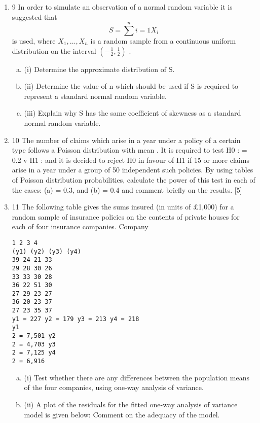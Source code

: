 \documentclass[a4paper,12pt]{article}
\begin{document}
\begin{enumerate}
\item
9 In order to simulate an observation of a normal random variable it is suggested that
\[S = \sum^{n}{i=1} X_i\]
is used, where $X_1, \ldots , X_n$ is a random sample from a continuous uniform distribution
on the interval $\displaystyle \left( -\frac{1}{2}, \frac{1}{2} \right)$ .
\begin{enumerate}[(a)]
    \item (i) Determine the approximate distribution of S. 
    \item (ii) Determine the value of n which should be used if S is required to represent a
standard normal random variable. 
    \item (iii) Explain why S has the same coefficient of skewness as a standard normal
random variable. 
\end{enumerate}

\item 10 The number of claims which arise in a year under a policy of a certain type follows a
Poisson distribution with mean . It is required to test
H0 : = 0.2 v H1 :
and it is decided to reject H0 in favour of H1 if 15 or more claims arise in a year under
a group of 50 independent such policies.
By using tables of Poisson distribution probabilities, calculate the power of this test in
each of the cases:
(a) = 0.3, and
(b) = 0.4
and comment briefly on the results. [5]
\item 11 The following table gives the sums insured (in units of £1,000) for a random sample
of insurance policies on the contents of private houses for each of four insurance
companies.
Company
\begin{verbatim}
1 2 3 4
(y1) (y2) (y3) (y4)
39 24 21 33
29 28 30 26
33 33 30 28
36 22 51 30
27 29 23 27
36 20 23 37
27 23 35 37
y1 = 227 y2 = 179 y3 = 213 y4 = 218
y1
2 = 7,501 y2
2 = 4,703 y3
2 = 7,125 y4
2 = 6,916
\end{verbatim}

\begin{enumerate}[(a)]
\item (i) Test whether there are any differences between the population means of the
four companies, using one-way analysis of variance.
\item 
(ii) A plot of the residuals for the fitted one-way analysis of variance model is
given below:
Comment on the adequacy of the model. 
\end{enumerate}


\end{enumerate}
\end{document}
